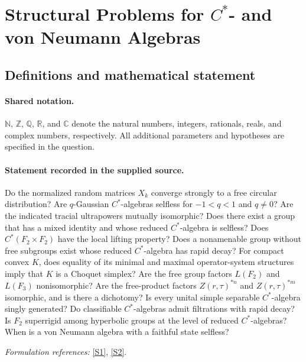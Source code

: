 \documentclass[11pt]{article}
\newcommand{\sref}[2]{\hyperlink{source:#1:#2}{[S#2]}}
\begin{document}
\section{\texorpdfstring{Structural Problems for $C^*$- and von Neumann Algebras}{Structural Problems for C\textasciicircum{}*- and von Neumann Algebras}}\label{statement}

\subsection{Definitions and mathematical statement}

\paragraph{Shared notation.}$\mathbb N$, $\mathbb Z$, $\mathbb Q$, $\mathbb R$, and $\mathbb C$ denote the natural numbers, integers, rationals, reals, and complex numbers, respectively. All additional parameters and hypotheses are specified in the question.


\paragraph{Statement recorded in the supplied source.}
Do the normalized random matrices $X_k$ converge strongly to a free circular distribution? Are $q$-Gaussian $C^*$-algebras selfless for $-1<q<1$ and $q\neq0$? Are the indicated tracial ultrapowers mutually isomorphic? Does there exist a group that has a mixed identity and whose reduced $C^*$-algebra is selfless? Does $C^*(F_2\times F_2)$ have the local lifting property? Does a nonamenable group without free subgroups exist whose reduced $C^*$-algebra has rapid decay? For compact convex $K$, does equality of its minimal and maximal operator-system structures imply that $K$ is a Choquet simplex? Are the free group factors $L(F_2)$ and $L(F_3)$ nonisomorphic? Are the free-product factors $Z(r,\tau)^{*n}$ and $Z(r,\tau)^{*m}$ isomorphic, and is there a dichotomy? Is every unital simple separable $C^*$-algebra singly generated? Do classifiable $C^*$-algebras admit filtrations with rapid decay? Is $F_2$ superrigid among hyperbolic groups at the level of reduced $C^*$-algebras? When is a von Neumann algebra with a faithful state selfless?
\par\smallskip\textit{Formulation references:} \sref{statement}{1}, \sref{statement}{2}.
\end{document}
